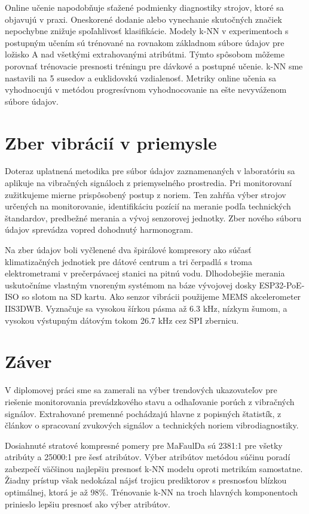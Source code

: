 Online učenie napodobňuje sťažené podmienky diagnostiky strojov, ktoré sa objavujú v praxi. Oneskorené dodanie alebo vynechanie skutočných značiek nepochybne znižuje spoľahlivosť klasifikácie. Modely k-NN v experimentoch s postupným učením sú trénované na rovnakom základnom súbore údajov pre ložisko A nad všetkými extrahovanými atribútmi. Týmto spôsobom môžeme porovnať trénovacie presnosti tréningu pre dávkové a postupné učenie. k-NN sme nastavili na 5 susedov a euklidovskú vzdialenosť. Metriky online učenia sa vyhodnocujú v metódou progresívnom vyhodnocovanie na ešte nevyváženom súbore údajov.

\section{Zber vibrácií v priemysle}
Doteraz uplatnená metodika pre súbor údajov zaznamenaných v laboratóriu sa aplikuje na vibračných signáloch z priemyselného prostredia. Pri monitorovaní zužitkujeme mierne prispôsobený postup z noriem. Ten zahŕňa výber strojov určených na monitorovanie, identifikáciu pozícií na meranie podľa technických štandardov, predbežné merania a vývoj senzorovej jednotky. Zber nového súboru údajov sprevádza vopred dohodnutý harmonogram.

Na zber údajov boli vyčlenené dva špirálové kompresory ako súčasť klimatizačných jednotiek pre dátové centrum a tri čerpadlá s troma elektrometrami v prečerpávacej stanici na pitnú vodu. Dlhodobejšie merania uskutočníme vlastným vnoreným systémom na báze vývojovej dosky ESP32-PoE-ISO so slotom na SD kartu. Ako senzor vibrácii použijeme MEMS akcelerometer IIS3DWB. Vyznačuje sa vysokou šírkou pásma až 6.3 kHz, nízkym šumom, a vysokou výstupným dátovým tokom 26.7 kHz cez SPI zbernicu.

\section{Záver}
V diplomovej práci sme sa zamerali na výber trendových ukazovateľov pre riešenie monitorovania prevádzkového stavu a odhaľovanie porúch z vibračných signálov.  Extrahované premenné pochádzajú hlavne z popisných štatistík, z článkov o spracovaní zvukových signálov a technických noriem vibrodiagnostiky.

Dosiahnuté stratové kompresné pomery pre MaFaulDa sú 2381:1 pre všetky atribúty a 25000:1 pre šesť atribútov. Výber atribútov metódou súčinu poradí zabezpečí väčšinou najlepšiu presnosť k-NN modelu oproti metrikám samostatne. Žiadny prístup však nedokázal nájsť trojicu prediktorov s presnosťou blízkou optimálnej, ktorá je až 98\%. Trénovanie k-NN na troch hlavných komponentoch prinieslo lepšiu presnosť ako výber atribútov. 

